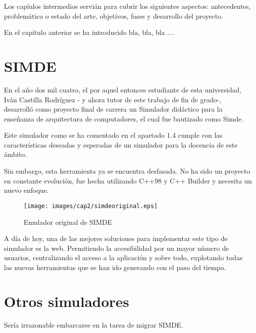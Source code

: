 

Los capíulos intermedios servián para cubrir los siguientes aspectos:
antecedentes, problemática o estado del arte, objetivos, fases y 
desarrollo del proyecto.

En el capítulo anterior se ha introducido bla, bla, bla ....


\section{SIMDE}
\label{2:sec1}

En el año dos mil cuatro, el por aquel entonces estudiante de esta universidad, 
Iván Castilla Rodríguez - y ahora tutor de este trabajo de fin de grado-, 
desarrolló como proyecto final de carrera un Simulador didáctico para la enseñanza 
de arquitectura de computadores, el cual fue bautizado como Simde. 

\bigskip
Este simulador como se ha comentado en el apartado 1.4 cumple con las características
deseadas y esperadas de un simulador para la docencia de este ámbito.

\bigskip
Sin embargo, esta herramienta ya se encuentra desfasada. No ha sido un proyecto en constante
evolución, fue hecha utilizando C++98 y C++ Builder y necesita un nuevo enfoque.

\begin{figure}[!th]
\begin{center}
\texttt{[image: images/cap2/simdeoriginal.eps]}
\caption{Emulador original de SIMDE}
\label{fig:Emulador original de SIMDE}
\end{center}
\end{figure}

A día de hoy, una de las mejores soluciones para implementar este tipo de simulador es la web.
Permitiendo la accesibilidad por un mayor número de usuarios, centralizando el acceso a la 
aplicación y sobre todo, explotando todas las nuevas herramientas que se han ido generando
con el paso del tiempo.

\section{Otros simuladores}
\label{2:sec2}

Sería irrazonable embarcarse en la tarea de migrar SIMDE. 

